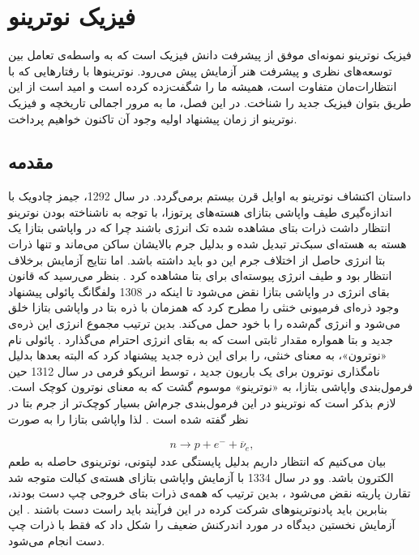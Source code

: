 \documentclass[a4paper]{book}
\begin{document}
\chapter{فیزیک نوترینو}
\label{chap:neutrino}
فیزیک نوترینو نمونه‌ای موفق از پیشرفت دانش فیزیک است که به واسطه‌ی تعامل بین توسعه‌های نظری و پیشرفت هنر آزمایش پیش می‌رود. نوترینوها با رفتارهایی که با انتظارات‌مان متفاوت است، همیشه ما را شگفت‌زده کرده است و امید است از این طریق بتوان فیزیک جدید را شناخت. در این فصل، ما به مرور اجمالی تاریخچه و فیزیک نوترینو از زمان پیشنهاد اولیه وجود آن تاکنون خواهیم پرداخت.

\section{مقدمه}
داستان اکتشاف نوترینو به اوایل قرن بیستم برمی‌گردد. در سال 1292، جیمز چادویک با اندازه‌گیری طیف واپاشی بتازای هسته‌های پرتوزا، با توجه به ناشناخته بودن نوترینو انتظار داشت ذرات بتای مشاهده شده تک انرژی باشند چرا که در واپاشی بتازا یک هسته به هسته‌ای سبک‌تر تبدیل شده و بدلیل جرم بالایشان ساکن می‌ماند و تنها ذرات بتا انرژی حاصل از اختلاف جرم این دو باید داشته باشد. اما نتایج آزمایش برخلاف انتظار بود و طیف انرژی پیوسته‌ای برای بتا مشاهده کرد \cite{Chadwick:262756}.
بنظر می‌رسید که قانون بقای انرژی در واپاشی بتازا نقض می‌شود تا اینکه در 1308 ولفگانگ پائولی پیشنهاد وجود ذره‌ای فرمیونی خنثی را مطرح کرد که همزمان با ذره بتا در واپاشی بتازا خلق می‌شود و انرژی گم‌شده را با خود حمل می‌کند. بدین ترتیب مجموع انرژی این ذره‌ی جدید و بتا همواره مقدار ثابتی است که به بقای انرژی احترام می‌گذارد \cite{Pauli:83282}.
پائولی نام «نوترون»، به معنای خنثی، را برای این ذره جدید پیشنهاد کرد که البته بعدها بدلیل نامگذاری نوترون برای یک باریون جدید \cite{noauthor_existence_1932}، توسط انریکو فرمی در سال 1312 حین فرمول‌بندی واپاشی بتازا، به «نوترینو» موسوم گشت که به معنای نوترون کوچک است. لازم بذکر است که نوترینو در این فرمول‌بندی جرم‌اش بسیار کوچک‌تر از جرم بتا در نظر گفته شده است \cite{fermi_versuch_1934}. لذا واپاشی بتازا را به صورت
\par
\vspace{-0.5cm}
{\footnotesize\begin{align}
	n \to p + e^- + \overline{\nu}_e,
	\label{pro:beta-decay}
\end{align}}
		بیان می‌کنیم که انتظار داریم بدلیل پایستگی عدد لپتونی، نوترینوی حاصله به طعم الکترون باشد. وو در سال 1334 با آزمایش واپاشی بتازای هسته‌ی کبالت متوجه شد تقارن پاریته نقض می‌شود \cite{Wu:1957my}، بدین ترتیب که همه‌ی ذرات بتای خروجی چپ دست بودند، بنابرین باید پادنوترینوهای شرکت کرده در این فرآیند باید راست دست باشند \cite{PhysRev.109.1015}. این آزمایش نخستین دیدگاه در مورد اندرکنش ضعیف را شکل داد که فقط با ذرات چپ دست انجام می‌شود.
\end{document}
